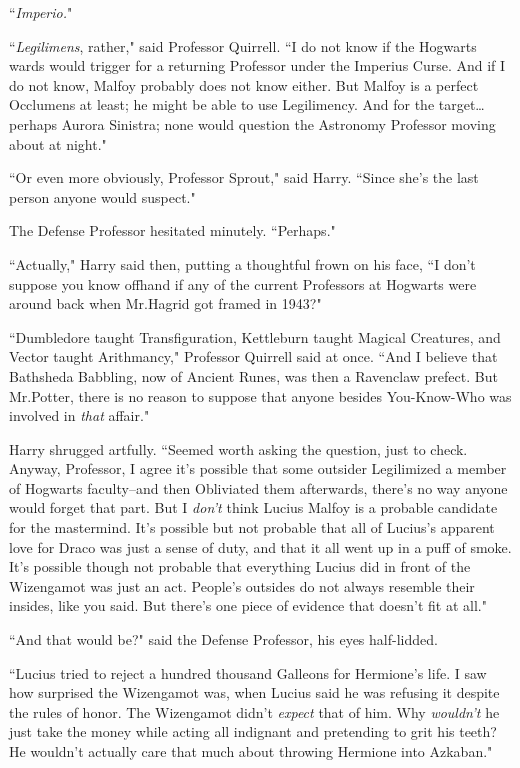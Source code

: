 ``\emph{Imperio.}"

``\emph{Legilimens}, rather," said Professor Quirrell. ``I do not know if the Hogwarts wards would trigger for a returning Professor under the Imperius Curse. And if I do not know, Malfoy probably does not know either. But Malfoy is a perfect Occlumens at least; he might be able to use Legilimency. And for the target{\ldots} perhaps Aurora Sinistra; none would question the Astronomy Professor moving about at night."

``Or even more obviously, Professor Sprout," said Harry. ``Since she's the last person anyone would suspect."

The Defense Professor hesitated minutely. ``Perhaps."

``Actually," Harry said then, putting a thoughtful frown on his face, ``I don't suppose you know offhand if any of the current Professors at Hogwarts were around back when Mr.\?Hagrid got framed in 1943?"

``Dumbledore taught Transfiguration, Kettleburn taught Magical Creatures, and Vector taught Arithmancy," Professor Quirrell said at once. ``And I believe that Bathsheda Babbling, now of Ancient Runes, was then a Ravenclaw prefect. But Mr.\?Potter, there is no reason to suppose that anyone besides You-Know-Who was involved in \emph{that} affair."

Harry shrugged artfully. ``Seemed worth asking the question, just to check. Anyway, Professor, I agree it's possible that some outsider Legilimized a member of Hogwarts faculty\---and then Obliviated them afterwards, there's no way anyone would forget that part. But I \emph{don't} think Lucius Malfoy is a probable candidate for the mastermind. It's possible but not probable that all of Lucius's apparent love for Draco was just a sense of duty, and that it all went up in a puff of smoke. It's possible though not probable that everything Lucius did in front of the Wizengamot was just an act. People's outsides do not always resemble their insides, like you said. But there's one piece of evidence that doesn't fit at all."

``And that would be?" said the Defense Professor, his eyes half-lidded.

``Lucius tried to reject a hundred thousand Galleons for Hermione's life. I saw how surprised the Wizengamot was, when Lucius said he was refusing it despite the rules of honor. The Wizengamot didn't \emph{expect} that of him. Why \emph{wouldn't} he just take the money while acting all indignant and pretending to grit his teeth? He wouldn't actually care that much about throwing Hermione into Azkaban."

